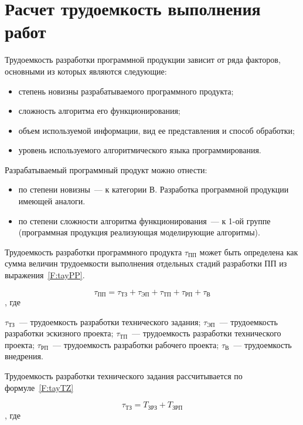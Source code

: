 \section{Расчет трудоемкость выполнения работ}

Трудоемкость разработки программной продукции зависит от ряда факторов, основными из которых являются следующие:

\begin{itemize}
\item степень новизны разрабатываемого программного продукта;
\item сложность алгоритма его функционирования;
\item объем используемой информации, вид ее представления и способ обработки;
\item уровень используемого алгоритмического языка программирования.
\end{itemize}

Разрабатываемый программный продукт можно отнести:

\begin{itemize}
\item по степени новизны~--- к категории В. Разработка программной продукции имеющей аналоги. 
\item по степени сложности алгоритма функционирования~--- к 1-ой группе (программная продукция реализующая моделирующие алгоритмы). 
\end{itemize}

Трудоемкость разработки программного продукта $\tau_{\text{ПП}}$ может быть определена как сумма величин трудоемкости выполнения отдельных стадий разработки ПП из выражения~\ref{F:tayPP}.

\begin{equation}
\tau_{\text{ПП}} = \tau_{\text{ТЗ}} + \tau_{\text{ЭП}} + \tau_{\text{ТП}} + \tau_{\text{РП}} + \tau_{\text{В}}
\label{F:tayPP}
\end{equation}, где

$\tau_{\text{ТЗ}}$~--- трудоемкость разработки технического задания; $\tau_{\text{ЭП}}$~--- трудоемкость разработки эскизного проекта; $\tau_{\text{ТП}}$~--- трудоемкость разработки технического проекта; $\tau_{\text{РП}}$~--- трудоемкость разработки рабочего проекта; $\tau_{\text{В}}$~--- трудоемкость внедрения.

Трудоемкость разработки технического задания рассчитывается по формуле~\ref{F:tayTZ}

\begin{equation}
\tau_{\text{ТЗ}} = T_{\text{ЗРЗ}} + T_{\text{ЗРП}}
\label{F:tayTZ}
\end{equation}, где

